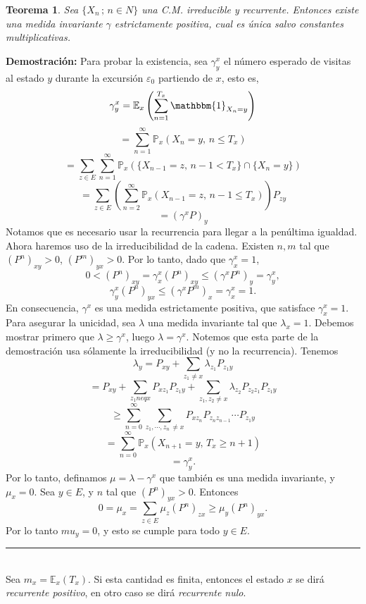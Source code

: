 \documentclass[a4paper]{article}
\newcommand{\prob}{\mathbb{P}}
\newtheorem{teorema}{Teorema}
\numberwithin{equation}{subsection}
\numberwithin{definicion}{subsection}
\def\E{\mathbb E}
\begin{document}
\begin{teorema}
Sea $\{X_n\,;\,n\in N\}$ una C.M. irreducible y recurrente. Entonces existe una medida invariante $\gamma$ estrictamente positiva, cual es única salvo constantes multiplicativas.
\end{teorema}

\textbf{Demostración: }Para probar la existencia, sea $\gamma_y^x$ el número esperado de visitas al estado $y$ durante la excursión $\varepsilon_0$ partiendo de $x$, esto es,
\[\gamma_y^x = \E_x\left(\sum_{n=1}^{T_x}\mathbbm{1}_{X_n=y}\right)\]
\[= \sum_{n=1}^{\infty}\prob_x \left(X_n = y,\, n\leq T_x\right)\]
\[=\sum_{z\in E}\sum_{n=1}^{\infty}\prob_x(\{X_{n-1}=z,\,n-1<T_x\}\cap\{X_n = y\})\]
\[=\sum_{z\in E}\left(\sum_{n=2}^{\infty}\prob_x(X_{n-1} = z,\,n-1\leq T_x)\right)P_{zy}\]
\[= (\gamma^x P)_y\]
Notamos que es necesario usar la recurrencia para llegar a la penúltima igualdad. Ahora haremos uso de la irreducibilidad de la cadena. Existen $n,m$ tal que $(P^n)_{xy}>0$, $(P^m)_{yx}>0$. Por lo tanto, dado que $\gamma_x^x = 1$,
\[0<(P^n)_{xy} = \gamma_x^x (P^n)_{xy}\leq (\gamma^x P^n)_y = \gamma_y^x,\]
\[\gamma_y^x(P^n)_{yx}\leq (\gamma^x P^m)_x = \gamma_x^x = 1.\]
En consecuencia, $\gamma^x$ es una medida estrictamente positiva, que satisface $\gamma_x^x =1$.\\ Para asegurar la unicidad, sea $\lambda$ una medida invariante tal que $\lambda_x = 1$. Debemos mostrar primero que $\lambda \geq \gamma^x$, luego $\lambda = \gamma^x$. Notemos que esta parte de la demostración usa sólamente la irreducibilidad (y no la recurrencia). Tenemos
\[\lambda_y = P_{xy} + \sum_{z_1 \neq x}\lambda_{z_1}P_{z_1 y}\]
\[= P_{xy} + \sum_{z_1neq x}P_{xz_1}P_{z_1y} + \sum_{z_1,z_2 \neq x}\lambda_{z_2}P_{z_2z_1}P_{z_1y}\]
\[\geq \sum_{n=0}^{\infty}\sum_{z_1,\cdots,z_n\,\neq x}P_{xz_n}P_{z_nz_{n-1}}\cdots P_{z_1y}\]
\[= \sum_{n=0}^{\infty}\prob_x\left(X_{n+1} =y,\, T_x \geq n+1\right)\]
\[= \gamma_y^x.\]
Por lo tanto, definamos $\mu = \lambda -\gamma^x$ que también es una medida invariante, y $\mu_x =0$. Sea $y\in E$, y $n$ tal que $(P^n)_{yx}>0$. Entonces
\[0 = \mu_x = \sum_{z \in E}\mu_z(P^n)_{zx} \geq \mu_y(P^n)_{yx}.\]
Por lo tanto $mu_y = 0$, y esto se cumple para todo $y \in E$.\\
\rule{0.7em}{0.7em}\\ \newline
Sea $m_x = \E_x(T_x)$. Si esta cantidad es finita, entonces el estado $x$ se dirá \textit{recurrente positivo}, en otro caso se dirá \textit{recurrente nulo}.
\end{document}
